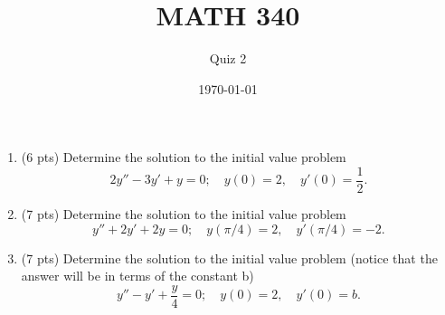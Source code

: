 \documentclass{article}
\begin{document}
\title{MATH 340}
\author{Quiz 2}
\date{\today}
\maketitle

\begin{enumerate}
\item (6 pts) Determine the solution to the initial value problem
	\[2y''-3y'+y=0;\quad y(0)=2, \quad y'(0)=\frac{1}{2}.\]
\vspace{6cm}
\item (7 pts) Determine the solution to the initial value problem
	\[y''+2y'+2y=0;\quad y(\pi/4)=2, \quad y'(\pi/4)=-2.\]
\newpage
\item (7 pts) Determine the solution to the initial value problem (notice that the answer will be in terms of the constant b)
	\[y''-y'+\frac{y}{4}=0;\quad y(0)=2, \quad y'(0)=b.\]
\end{enumerate}
\end{document}
